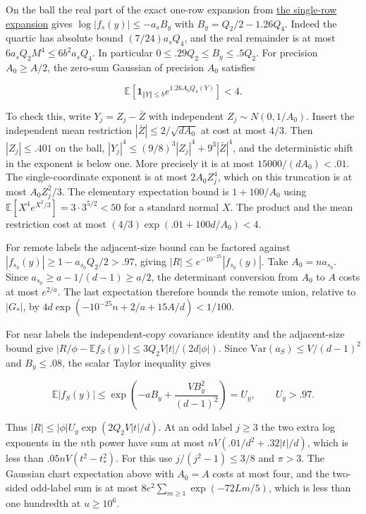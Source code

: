 \documentclass[11pt]{article}
\begin{document}
On the ball the real part of the exact one-row expansion from
\href{https://github.com/ProgramComputer/open-math-research/blob/main/topics/balanced-arrays/effective-sublinear/direct-row-expansion.md}{the single-row expansion} gives
$\log|f_s(y)|\le-a_s B_y$ with
$B_y=Q_2/2-1.26Q_4$. Indeed the quartic has absolute
bound $(7/24)a_sQ_4$, and the real remainder is at most
$6a_sQ_2 M^4\le6b^2a_sQ_4$. In particular
$0\le .29Q_2\le B_y\le .5Q_2$. For precision $A_0\ge A/2$,
the zero-sum Gaussian of precision $A_0$ satisfies

\[
\mathbb E[\mathbf1_{\Vert Y\Vert \le b}e^{1.26 A_0 Q_4(Y)}]<4.
\]

To check this, write $Y_j=Z_j-\bar Z$ with independent
$Z_j\sim N(0,1/A_0)$. Insert the independent mean restriction
$|\bar Z|\le 2/\sqrt{d A_0}$ at cost at most $4/3$.
Then $|Z_j|\le .401$ on the ball,
$|Y_j|^4\le (9/8)^3 |Z_j|^4+9^3|\bar Z|^4$,
and the deterministic shift in the exponent is below one.
More precisely it is at most $15000/(d A_0)<.01$.
The single-coordinate exponent is at most $2A_0Z_j^4$,
which on this truncation is at most $A_0 Z_j^2/3$.
The elementary expectation bound is $1+100/A_0$ using
$\mathbb E[X^4e^{X^2/3}]=3\cdot3^{5/2}<50$ for a standard
normal $X$. The product and the mean restriction cost at most
$(4/3)\exp(.01+100d/A_0)<4$.

For remote labels the adjacent-size bound can be factored against
$|f_{s_0}(y)|\ge1-a_{s_0}Q_2/2>.97$, giving
$|R|\le e^{-10^{-25}}|f_{s_0}(y)|$.
Take $A_0=n a_{s_0}$. Since
$a_{s_0}\ge a-1/(d-1)\ge a/2$, the determinant conversion from
$A_0$ to $A$ costs at most $e^{2/a}$. The last expectation
therefore bounds the remote union, relative to $|G_{\ast}|$, by
$4d\exp(-10^{-25}n+2/a+15A/d)<1/100$.

For near labels the independent-copy covariance identity and the
adjacent-size bound give
$|R/\phi-\mathbb E f_S(y)|\le 3Q_2 V|t|/(2d|\phi|)$.
Since $\mathrm{Var}(a_S)\le V/(d-1)^2$ and $B_y\le .08$,
the scalar Taylor inequality gives

\[
\mathbb E|f_S(y)|
\le\exp\left(-aB_y+\frac{V B_y^2}{(d-1)^2}\right)=U_y,
\qquad U_y>.97.
\]

Thus $|R|\le |\phi|U_y\exp(2Q_2 V|t|/d)$.
At an odd label $j\ge3$ the two extra log exponents in the
$n$th power have sum at most $nV(.01/d^2+.32|t|/d)$,
which is less than $.05 nV(t^2-t_{\ast}^2)$. For this use
$j/(j^2-1)\le3/8$ and $\pi>3$. The Gaussian chart
expectation above with $A_0=A$ costs at most four, and the two-sided odd-label sum is at most $8e^2\sum_{m\ge1}\exp(-72Lm/5)$, which is less than one hundredth at $u\ge10^6$.
\end{document}
